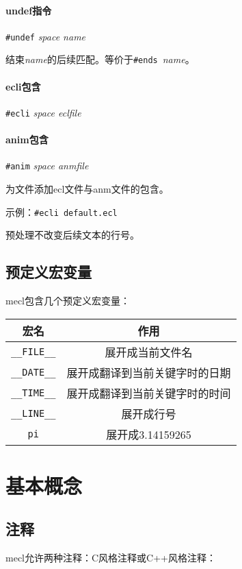 \documentclass[UTF8]{ctexart}
\begin{document}
\paragraph{undef指令} \verb|#undef| \textit{space name}

结束\textit{name}的后续匹配。等价于\verb|#ends|\ \textit{name}。

\paragraph{ecli包含} \verb|#ecli| \textit{space eclfile}
\paragraph{anim包含} \verb|#anim| \textit{space anmfile}

为文件添加ecl文件与anm文件的包含。

示例：\verb|#ecli default.ecl|

预处理不改变后续文本的行号。

\subsection{预定义宏变量}

mecl包含几个预定义宏变量：

\begin{table}[H]
	\centering
	\begin{tabular}{c|c}
		\hline
		宏名 & 作用 \\\hline
		\verb|__FILE__| & 展开成当前文件名 \\\hline
		\verb|__DATE__| & 展开成翻译到当前关键字时的日期 \\\hline
		\verb|__TIME__| & 展开成翻译到当前关键字时的时间 \\\hline
		\verb|__LINE__| & 展开成行号 \\\hline
		\verb|pi| & 展开成3.14159265 \\\hline
	\end{tabular}
\end{table}

\section{基本概念}

\subsection{注释}

mecl允许两种注释：C风格注释或C++风格注释：
\end{document}
